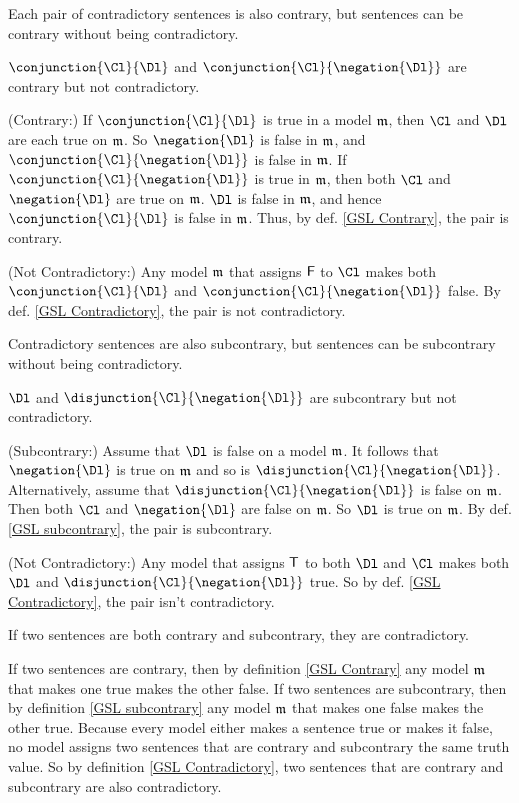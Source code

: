 \begin{majorILnc}{}
Each pair of contradictory sentences is also contrary, but sentences can be contrary without being contradictory.
\end{majorILnc}
\begin{PROOF}
$\conjunction{\Cl}{\Dl}$ and $\conjunction{\Cl}{\negation{\Dl}}$ are contrary but not contradictory.

(Contrary:) If $\conjunction{\Cl}{\Dl}$ is true in a model $\mathfrak{m}$, then $\Cl$ and $\Dl$ are each true on $\mathfrak{m}$. 
So $\negation{\Dl}$ is false in $\mathfrak{m}$, and $\conjunction{\Cl}{\negation{\Dl}}$ is false in $\mathfrak{m}$.
If $\conjunction{\Cl}{\negation{\Dl}}$ is true in $\mathfrak{m}$, then both $\Cl$ and $\negation{\Dl}$ are true on $\mathfrak{m}$.
$\Dl$ is false in $\mathfrak{m}$, and hence $\conjunction{\Cl}{\Dl}$ is false in $\mathfrak{m}$.
Thus, by def. \ref{GSL Contrary}, the pair is contrary.

(Not Contradictory:) Any model $\mathfrak{m}$ that assigns $\mathsf{F}$ to $\Cl$ makes both $\conjunction{\Cl}{\Dl}$ and $\conjunction{\Cl}{\negation{\Dl}}$ false.
By def. \ref{GSL Contradictory}, the pair is not contradictory.
\end{PROOF}
\begin{majorILnc}{}
Contradictory sentences are also subcontrary, but sentences can be subcontrary without being contradictory. 
\end{majorILnc}
\begin{PROOF}
$\Dl$ and $\disjunction{\Cl}{\negation{\Dl}}$ are subcontrary but not contradictory.

(Subcontrary:) Assume that $\Dl$ is false on a model $\mathfrak{m}$.
It follows that $\negation{\Dl}$ is true on $\mathfrak{m}$ and so is $\disjunction{\Cl}{\negation{\Dl}}$. 
Alternatively, assume that $\disjunction{\Cl}{\negation{\Dl}}$ is false on $\mathfrak{m}$.  Then both $\Cl$ and $\negation{\Dl}$ are false on $\mathfrak{m}$.
So $\Dl$ is true on $\mathfrak{m}$.
By def. \ref{GSL subcontrary}, the pair is subcontrary.

(Not Contradictory:) Any model that assigns $\mathsf{T}$ to both $\Dl$ and $\Cl$ makes both $\Dl$ and $\disjunction{\Cl}{\negation{\Dl}}$ true. 
So by def. \ref{GSL Contradictory}, the pair isn't contradictory.
\end{PROOF}
\begin{majorILnc}{}
If two sentences are both contrary and subcontrary, they are contradictory. 
\end{majorILnc}
\begin{PROOF}
If two sentences are contrary, then by definition \ref{GSL Contrary} any model $\mathfrak{m}$ that makes one true makes the other false. 
If two sentences are subcontrary, then by definition \ref{GSL subcontrary} any model $\mathfrak{m}$ that makes one false makes the other true. 
Because every model either makes a sentence true or makes it false, no model assigns two sentences that are contrary and subcontrary the same truth value. 
So by definition \ref{GSL Contradictory}, two sentences that are contrary and subcontrary are also contradictory. 
\end{PROOF}
